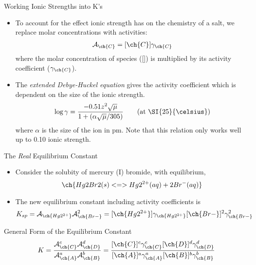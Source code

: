 \documentclass[notes=onlyslideswithnotes,notes=hide]{beamer}
\begin{document}
\begin{frame}{Working Ionic Strengths into K's}
	\begin{itemize}
		\item To account for the effect ionic strength has on the
			chemistry of a salt, we replace molar concentrations
			with activities:
			\begin{align*}
				\mathcal{A}_{\ch{C}} = [\ch{C}]\gamma_{\ch{C}}
			\end{align*}
			where the molar concentration of species 
			([]) is multiplied by its activity coefficient
			($\gamma_{\ch{C}}$).
		\item The \emph{extended Debye-Huckel equation} gives the
			activity coefficient which is dependent on the size of
			the ionic strength.
			\begin{align*}
				\log \gamma = \dfrac{-0.51z^2\sqrt{\mu}}{1 +
				(\alpha \sqrt{\mu}/305)} \qquad\text{(at
				\SI{25}{\celsius})}
			\end{align*}
			where $\alpha$ is the size of the ion in
			\si{\pico\meter}. Note that this relation only works
			well up to \SI{0.10}{\Molar} ionic strength.
	\end{itemize}
\end{frame}

\begin{frame}{The \emph{Real} Equilibrium Constant}
	\begin{itemize}
		\item Consider the solubity of mercury (I) bromide, with
			equilibrium,
			\begin{align*}
				\ch{Hg2Br2(s) <=> Hg2^{2+}(aq) + 2 Br^{-}(aq)}
			\end{align*}
		\item The new equilibrium constant including activity
			coefficients is
			\begin{align*}
				K_{sp} = \mathcal{A}_{\ch{Hg2^{2+}}}
				\mathcal{A}_{\ch{Br-}}^2 =
				[\ch{Hg2^{2+}}]\gamma_{\ch{Hg2^{2+}}}
				[\ch{Br-}]^2\gamma_{\ch{Br-}}^2
			\end{align*}
	\end{itemize}

	\pause

	\begin{block}{General Form of the Equilibrium Constant}
		\begin{align*}
			K = \dfrac{\mathcal{A}^c_{\ch{C}}
			\mathcal{A}^d_{\ch{D}}}{\mathcal{A}^a_{\ch{A}}
			\mathcal{A}^b_{\ch{B}}} = \dfrac{[\ch{C}]^c
			\gamma_{\ch{C}}^c [\ch{D}]^d \gamma_{\ch{D}}^d}
			{[\ch{A}]^a \gamma_{\ch{A}}^a [\ch{B}]^b
			\gamma_{\ch{B}}^b}
		\end{align*}
	\end{block}
\end{frame}
\end{document}

